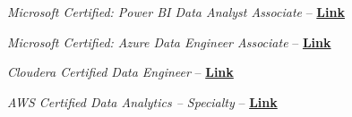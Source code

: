 \begin{inlineitems}



  
  \item \emph{Microsoft Certified: Power BI Data Analyst Associate} – \textbf{\href{https://www.example.com/certificate}{Link}}

  \item \emph{Microsoft Certified: Azure Data Engineer Associate} – \textbf{\href{https://www.example.com/certificate}{Link}}

  \item \emph{Cloudera Certified Data Engineer} – \textbf{\href{https://www.example.com/certificate}{Link}}

  \item \emph{AWS Certified Data Analytics – Specialty} – \textbf{\href{https://www.example.com/certificate}{Link}}
  
\end{inlineitems}
